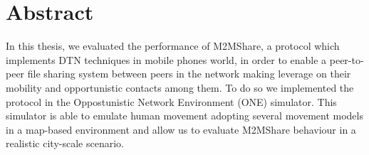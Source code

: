 \chapter*{Abstract}
\label{abstract}
In this thesis, we evaluated the performance of M2MShare, a protocol which implements DTN techniques in mobile phones world, in order to enable a peer-to-peer file sharing system between peers in the network making leverage on their mobility and opportunistic contacts among them. To do so we implemented the protocol in the Oppostunistic Network Environment (ONE) simulator. This simulator is able to emulate human movement adopting several movement models in a map-based environment and allow us to evaluate M2MShare behaviour in a realistic city-scale scenario.

